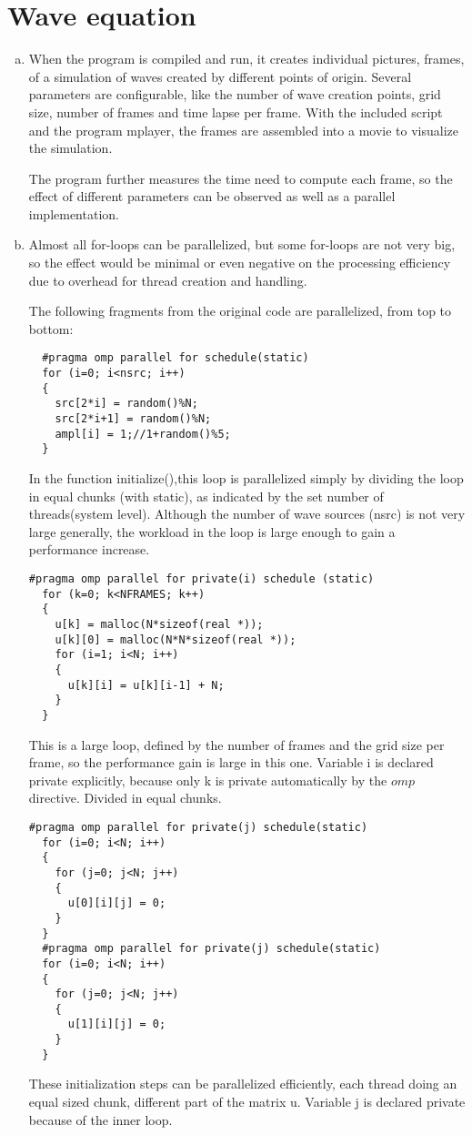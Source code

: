 \documentclass[a4paper]{article}
\begin{document}
\section{Wave equation}
\begin{enumerate}[(a)]
\item When the program is compiled and run, it creates individual pictures, frames, of a simulation of waves created by different points of origin. Several parameters are configurable, like the number of wave creation points, grid size, number of frames and time lapse per frame. With the included script and the program mplayer, the frames are assembled into a movie to visualize the simulation.

The program further measures the time need to compute each frame, so the effect of different parameters can be observed as well as a parallel implementation.

\item Almost all for-loops can be parallelized, but some for-loops are not very big, so the effect would be minimal or even negative on the processing efficiency due to overhead for thread creation and handling.

The following fragments from the original code are parallelized, from top to bottom:
\begin{verbatim}
  #pragma omp parallel for schedule(static)
  for (i=0; i<nsrc; i++)
  {
    src[2*i] = random()%N;
    src[2*i+1] = random()%N;
    ampl[i] = 1;//1+random()%5;
  }
\end{verbatim}
In the function initialize(),this loop is parallelized simply by dividing the loop in equal chunks (with static), as indicated by the set number of threads(system level). Although the number of wave sources (nsrc) is not very large generally, the workload in the loop is large enough to gain a performance increase.

\begin{verbatim}
#pragma omp parallel for private(i) schedule (static)
  for (k=0; k<NFRAMES; k++)
  {
    u[k] = malloc(N*sizeof(real *));
    u[k][0] = malloc(N*N*sizeof(real *));
    for (i=1; i<N; i++)
    {
      u[k][i] = u[k][i-1] + N;
    }
  }
\end{verbatim}
This is a large loop, defined by the number of frames and the grid size per frame, so the performance gain is large in this one. Variable i is declared private explicitly, because only k is private automatically by the $omp$ directive. Divided in equal chunks.

\begin{verbatim}
#pragma omp parallel for private(j) schedule(static)
  for (i=0; i<N; i++)
  {
    for (j=0; j<N; j++)
    {
      u[0][i][j] = 0;
    }
  }
  #pragma omp parallel for private(j) schedule(static)
  for (i=0; i<N; i++)
  {
    for (j=0; j<N; j++)
    {
      u[1][i][j] = 0;
    }
  }
\end{verbatim}
These initialization steps can be parallelized efficiently, each thread doing an equal sized chunk, different part of the matrix u. Variable j is declared private because of the inner loop.


\end{enumerate}
\end{document}
